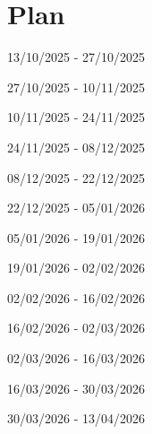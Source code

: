 \section*{Plan}

13/10/2025 - 27/10/2025

27/10/2025 - 10/11/2025

10/11/2025 - 24/11/2025

24/11/2025 - 08/12/2025

08/12/2025 - 22/12/2025

22/12/2025 - 05/01/2026

05/01/2026 - 19/01/2026

19/01/2026 - 02/02/2026

02/02/2026 - 16/02/2026

16/02/2026 - 02/03/2026

02/03/2026 - 16/03/2026

16/03/2026 - 30/03/2026

30/03/2026 - 13/04/2026

